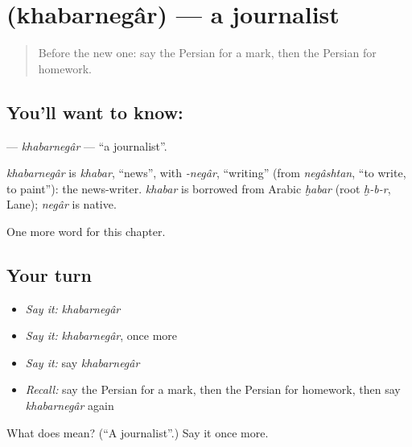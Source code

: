 \section[\texorpdfstring{\fa{خبرنگار} (khabarnegâr)}{خبرنگار (khabarnegâr)}]{ (khabarnegâr) — a journalist}

\label{lesson:FA-C215-khabarnegar}



\begin{quote}
Before the new one: say the Persian for a mark, then the Persian for homework.
\end{quote}

\subsection*{You'll want to know: }
\textbf{} — \emph{khabarnegâr} — \textquotedblleft{}a journalist\textquotedblright{}.

\begin{cousinweb}
\emph{khabarnegâr} is \emph{khabar}, \textquotedblleft{}news\textquotedblright{}, with \emph{-negâr}, \textquotedblleft{}writing\textquotedblright{} (from \emph{negâshtan}, \textquotedblleft{}to write, to paint\textquotedblright{}): the news-writer. \emph{khabar} is borrowed from Arabic \emph{ḫabar} (root \emph{ḫ-b-r}, Lane); \emph{negâr} is native.
\end{cousinweb}

\begin{grammarlens}[title={What you've built}]
One more word for this chapter.
\end{grammarlens}

\subsection*{Your turn}
\begin{itemize}
\raggedright
  \item \emph{Say it:} \emph{khabarnegâr}
  \item \emph{Say it:} \emph{khabarnegâr}, once more
  \item \emph{Say it:} say \emph{khabarnegâr}
  \item \emph{Recall:} say the Persian for a mark, then the Persian for homework, then say \emph{khabarnegâr} again
\end{itemize}

\begin{tcolorbox}[breakable,colback=teal!4,colframe=teal!35!black,title={Before you move on}]
What does  mean? (\textquotedblleft{}A journalist\textquotedblright{}.) Say it once more.
\end{tcolorbox}
